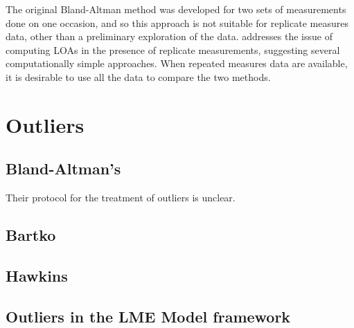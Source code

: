 \documentclass[12pt, a4paper]{report}
\theoremstyle{plain}
\theoremstyle{definition}
\theoremstyle{remark}
\begin{document}
The original Bland-Altman method was developed for two sets of measurements done on one occasion, and so this approach is not suitable for replicate measures data, other than a preliminary exploration of the data. \citet{BA99} addresses the issue of computing LOAs in the presence of replicate measurements, suggesting several computationally simple approaches. When repeated measures data are available, it is desirable to use all the data to compare the two methods. 



%



\section{Outliers}

\subsection{Bland-Altman's}
Their protocol for the treatment of outliers is unclear.
\subsection{Bartko}

\subsection{Hawkins}

\subsection{Outliers in the LME Model framework}






\end{document}
